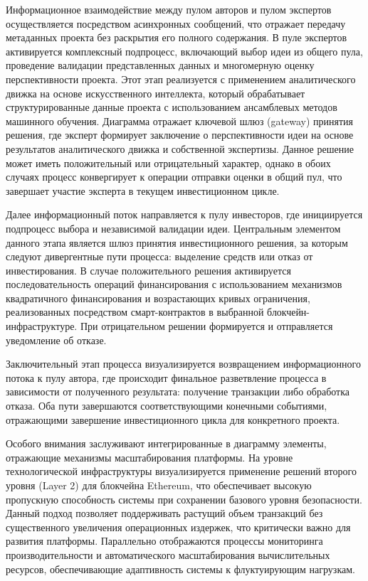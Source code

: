 \documentclass[
    candidate, %
    subf, %
    dotsinheaders=false,
]{disser}
\begin{document}
Информационное взаимодействие между пулом авторов и пулом экспертов осуществляется посредством асинхронных сообщений, что отражает передачу метаданных проекта без раскрытия его полного содержания. В пуле экспертов активируется комплексный подпроцесс, включающий выбор идеи из общего пула, проведение валидации представленных данных и многомерную оценку перспективности проекта. Этот этап реализуется с применением аналитического движка на основе искусственного интеллекта, который обрабатывает структурированные данные проекта с использованием ансамблевых методов машинного обучения. Диаграмма отражает ключевой шлюз (gateway) принятия решения, где эксперт формирует заключение о перспективности идеи на основе результатов аналитического движка и собственной экспертизы. Данное решение может иметь положительный или отрицательный характер, однако в обоих случаях процесс конвергирует к операции отправки оценки в общий пул, что завершает участие эксперта в текущем инвестиционном цикле.

Далее информационный поток направляется к пулу инвесторов, где инициируется подпроцесс выбора и независимой валидации идеи. Центральным элементом данного этапа является шлюз принятия инвестиционного решения, за которым следуют дивергентные пути процесса: выделение средств или отказ от инвестирования. В случае положительного решения активируется последовательность операций финансирования с использованием механизмов квадратичного финансирования и возрастающих кривых ограничения, реализованных посредством смарт-контрактов в выбранной блокчейн-инфраструктуре. При отрицательном решении формируется и отправляется уведомление об отказе.

Заключительный этап процесса визуализируется возвращением информационного потока к пулу автора, где происходит финальное разветвление процесса в зависимости от полученного результата: получение транзакции либо обработка отказа. Оба пути завершаются соответствующими конечными событиями, отражающими завершение инвестиционного цикла для конкретного проекта.

Особого внимания заслуживают интегрированные в диаграмму элементы, отражающие механизмы масштабирования платформы. На уровне технологической инфраструктуры визуализируется применение решений второго уровня (Layer 2) для блокчейна Ethereum, что обеспечивает высокую пропускную способность системы при сохранении базового уровня безопасности. Данный подход позволяет поддерживать растущий объем транзакций без существенного увеличения операционных издержек, что критически важно для развития платформы. Параллельно отображаются процессы мониторинга производительности и автоматического масштабирования вычислительных ресурсов, обеспечивающие адаптивность системы к флуктуирующим нагрузкам.
\end{document}
